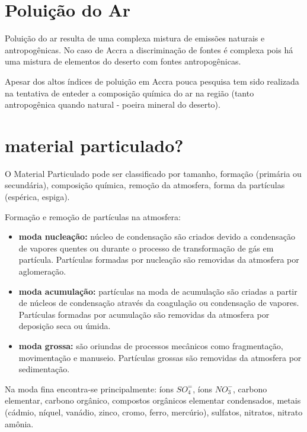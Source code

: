 
\section{Poluição do Ar}

Poluição do ar resulta de uma complexa mistura de emissões naturais e 
antropogênicas. No caso de Accra a discriminação de fontes é complexa pois
há uma mistura de elementos do deserto com fontes antropogênicas.

Apesar dos altos índices de poluição em Accra pouca pesquisa tem sido 
realizada na tentativa de enteder a composição química do ar na região
(tanto antropogênica quando natural - poeira mineral do deserto). 




\section{material particulado?}

O Material Particulado pode ser classificado por tamanho, formação 
(primária ou secundária), composição química, remoção da atmosfera, 
forma da partículas (espérica, espiga).

Formação e remoção de partículas na atmosfera:
\begin{itemize}
  \item \textbf{moda nucleação:} núcleo de condensação são criados devido a 
        condensação de vapores quentes ou durante o processo de 
        transformação de gás em partícula. Partículas formadas por 
        nucleação são removidas da atmosfera por aglomeração. 
  \item \textbf{moda acumulação:} partículas na moda de acumulação são criadas 
         a partir de núcleos de condensação através da coagulação ou 
         condensação de vapores. Partículas formadas por acumulação
         são removidas da atmosfera por deposição seca ou úmida.
  \item \textbf{moda grossa:} são oriundas de processos mecânicos como fragmentação, 
        movimentação e manuseio. Partículas grossas são removidas da atmosfera 
        por sedimentação.
\end{itemize}


Na moda fina encontra-se principalmente: íons $SO_4^=$, 
íons $ NO_3^-$, carbono elementar, carbono orgânico, compostos orgânicos elementar
condensados, metais (cádmio, níquel, vanádio, zinco, cromo, ferro, mercúrio), 
sulfatos, nitratos, nitrato amônia. 

